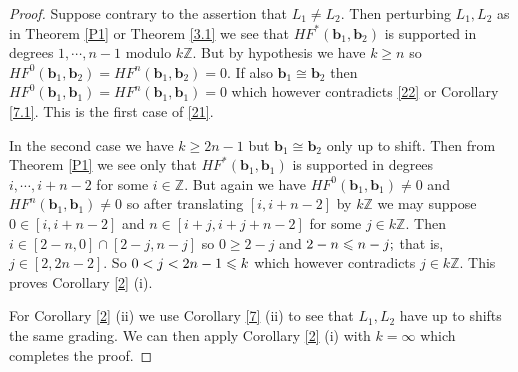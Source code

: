 \documentclass{article}
\DeclareMathOperator{\Def}{Def}
\theoremstyle{plain}%
\theoremstyle{definition}
\numberwithin{equation}{section}
\numberwithin{figure}{section}
\def\eq{\eqref}
\def\ge{\geqslant}
\def\le{\leqslant\nobreak}
\def\Z{{\mathbin{\mathbb Z}}}
\def\iy{\infty}
\def\b{{\mathbf{b}}}
\begin{document}
\begin{proof}
Suppose contrary to the assertion that $L_1\ne L_2.$
Then perturbing $L_1,L_2$ as in Theorem \ref{P1} or Theorem \ref{3.1} 
we see that $HF^*(\b_1,\b_2)$ is supported in degrees $1,\cdots,n-1$ modulo $k\Z.$
But by hypothesis we have $k\ge n$ so $HF^0(\b_1,\b_2)=HF^n(\b_1,\b_2)=0.$ 
If also $\b_1\cong\b_2$ then $HF^0(\b_1,\b_1)=HF^n(\b_1,\b_1)=0$ which however contradicts \eq{22} or Corollary \ref{7.1}. This is the first case of \eq{21}.

In the second case we have $k\ge2n-1$ but $\b_1\cong\b_2$ only up to shift.
Then from Theorem \ref{P1} we see only that
$HF^*(\b_1,\b_1)$ is supported in degrees $i,\cdots,i+n-2$ for some $i\in\Z.$
But again we have $HF^0(\b_1,\b_1)\ne0$ and $HF^n(\b_1,\b_1)\ne0$ so after translating $[i,i+n-2]$ by $k\Z$
we may suppose $0\in[i,i+n-2]$ and $n\in[i+j,i+j+n-2]$ for some $j\in k\Z.$
Then $i\in[2-n,0]\cap[2-j,n-j]$ so $0\ge 2-j$ and $2-n\le n-j;$ that is, $j\in[2, 2n-2].$
So $0<j<2n-1\le k$ which however contradicts $j\in k\Z.$
This proves Corollary \ref{2} (i).

For Corollary \ref{2} (ii) we use Corollary \ref{7} (ii) to see that $L_1,L_2$ have up to shifts the same grading.
We can then apply Corollary \ref{2} (i) with $k=\iy$ which completes the proof.
\end{proof}








\end{document}
